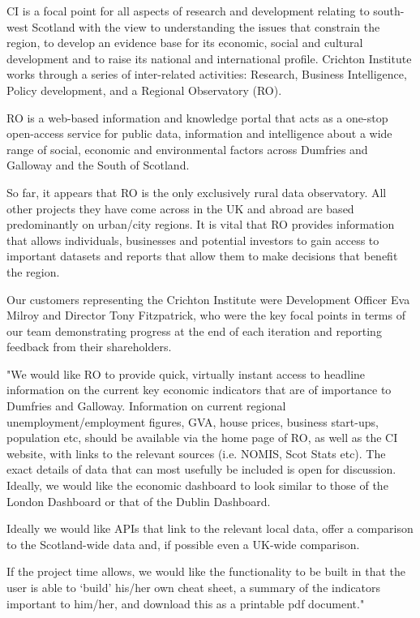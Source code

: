 \documentclass{l3proj}
\begin{document}
CI is a focal point for all aspects of research and development relating to south-west Scotland with the view to understanding the
issues that constrain the region, to develop an evidence base for its economic, social and cultural development and to raise its
national and international profile. Crichton Institute works through a series of inter-related activities: Research,
Business Intelligence, Policy development, and a Regional Observatory (RO).

RO is a web-based information and knowledge portal that acts as a one-stop open-access service for public data, information and
intelligence about a wide range of social, economic and environmental factors across Dumfries and Galloway and the South of Scotland.

So far, it appears that RO is the only exclusively rural data observatory. All other projects they have come across in the UK and abroad
are based predominantly on urban/city regions. It is vital that RO provides information that allows individuals, businesses and potential
investors to gain access to important datasets and reports that allow them to make decisions that benefit the region.

Our customers representing the Crichton Institute were Development Officer Eva Milroy and Director Tony Fitzpatrick, who were the key
focal points in terms of our team demonstrating progress at the end of each iteration and reporting feedback from their shareholders.


"We would like RO to provide quick, virtually instant access to headline information on the current key economic indicators that are of
importance to Dumfries and Galloway. Information on current regional unemployment/employment figures, GVA, house prices, business start-ups,
population etc, should be available via the home page of RO, as well as the CI website, with links to the relevant sources
(i.e. NOMIS, Scot Stats etc). The exact details of data that can most usefully be included is open for discussion. Ideally, we would like
the economic dashboard to look similar to those of the London Dashboard or that of the Dublin Dashboard.

Ideally we would like APIs that link to the relevant local data, offer a comparison to the Scotland-wide data and,
if possible even a UK-wide comparison.

If the project time allows, we would like the functionality to be built in that the user is able to ‘build’ his/her own cheat sheet,
a summary of the indicators important to him/her, and download this as a printable pdf document."
\end{document}
